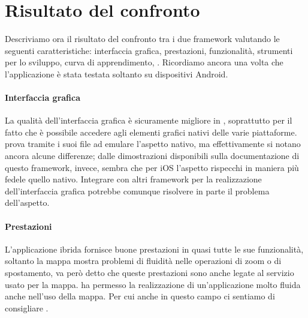 \chapter{Risultato del confronto}
    Descriviamo ora il risultato del confronto tra i due framework valutando
    le seguenti caratteristiche: interfaccia grafica, prestazioni,
    funzionalità, strumenti per lo sviluppo, curva di apprendimento,
    \crossplat{}. Ricordiamo ancora una
    volta che l'applicazione è stata testata soltanto su dispositivi Android.
        \subsubsection{Interfaccia grafica}
        La qualità dell'interfaccia grafica è sicuramente migliore in \tisdk{},
        soprattutto per il fatto che è possibile accedere agli elementi
        grafici nativi delle varie piattaforme. \kendomob{} prova tramite i
        suoi file \css{} ad emulare l'aspetto nativo, ma effettivamente si
        notano ancora alcune differenze; dalle dimostrazioni disponibili sulla
        documentazione di questo framework, invece, sembra che per iOS l'aspetto
        rispecchi in maniera più fedele quello nativo. Integrare \pg{} con
        altri framework per la realizzazione dell'interfaccia grafica potrebbe
        comunque risolvere in parte il problema dell'aspetto.
        \subsubsection{Prestazioni}
        L'applicazione ibrida fornisce buone prestazioni in quasi tutte
        le sue funzionalità, soltanto la mappa mostra problemi di fluidità
        nelle operazioni di zoom o di spostamento, va però detto che queste
        prestazioni sono anche legate al servizio usato per la mappa.
        \tisdk{} ha permesso la realizzazione di un'applicazione molto fluida
        anche nell'uso della mappa. Per cui anche in questo campo ci sentiamo
        di consigliare \tisdk{}.

